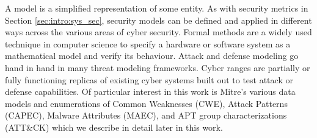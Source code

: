 

A model is a simplified representation of some entity. As with security metrics in Section \ref{sec:intro:sys_sec}, security models can be defined and applied in different ways across the various areas of cyber security. Formal methods are a widely used technique in computer science to specify a hardware or software system as a mathematical model and verify its behaviour\cite{Bell_LaPadula_1973}. Attack and defense modeling go hand in hand in many\cite{Duggan_Michalski, Ellison, Hutchins_Cloppert_Amin, Morana_2015, Schneier_1999, Schoenfield, Shostack, Woodard_Veitch_Thomas_Duggan_2007} threat modeling frameworks. Cyber ranges\cite{Costa_Russo_Armando} are partially or fully functioning replicas of existing cyber systems built out to test attack or defense capabilities.  Of particular interest in this work is Mitre's various\cite{Corporation} data models and enumerations of Common Weaknesses (CWE), Attack Patterns (CAPEC), Malware Attributes (MAEC), and APT group characterizations (ATT\&CK) which we describe in detail later in this work. 


